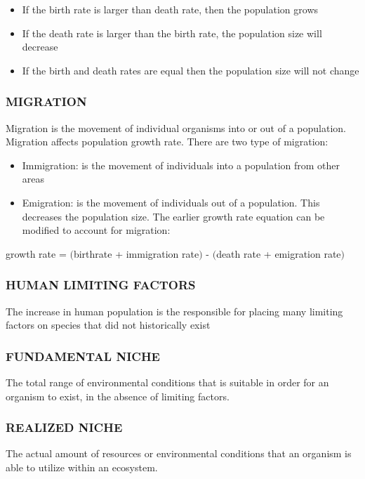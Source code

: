 \documentclass[a4paper,12pt]{report}
\numberwithin{equation}{section}
\begin{document}
\begin{itemize}
	\item If the birth rate is larger than death rate, then the population grows
	\item If the death rate is larger than the birth rate, the population size will decrease
	\item If the birth and death rates are equal then the population size will not change
\end{itemize}
   
\subsubsection{MIGRATION}
\indent Migration is the movement of individual organisms into or out of a population. Migration affects population growth rate. There are two type of migration:
\begin{itemize}
	\item Immigration: is the movement of individuals into a population from other areas
	\item Emigration: is the movement of individuals out of a population. This decreases the population size. The earlier growth rate equation can be modified to account for migration:
\end{itemize}
	\begin{center}
	growth rate = $($birthrate + immigration rate$)$ - $($death rate + emigration rate$)$
	\end{center}

\subsubsection{HUMAN LIMITING FACTORS}
The increase in human population is the responsible for placing many limiting factors on species that did not historically exist

\subsubsection{FUNDAMENTAL NICHE}
The total range of environmental conditions that is suitable in order for an organism to exist, in the absence of limiting factors.

\subsubsection{REALIZED NICHE}
The actual amount of resources or environmental conditions that an organism is able to utilize within an ecosystem.
\end{document}
